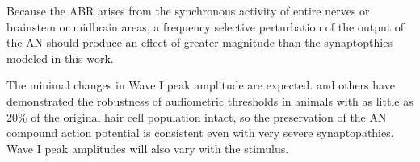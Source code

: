 Because the ABR arises from the synchronous activity of entire nerves or brainstem or midbrain areas, a frequency selective perturbation of the output of the AN should produce an effect of greater magnitude than the synaptopthies modeled in this work. 

The minimal changes in Wave I peak amplitude are expected.
\citeauthor{Liberman2014Efferent} and others have demonstrated the robustness of audiometric thresholds in animals with as little as 20\% of the original hair cell population intact, so the preservation of the AN compound action potential is consistent even with very severe synaptopathies.  Wave I peak amplitudes will also vary with the stimulus.  
